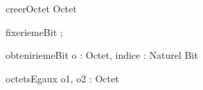 
\begin{algorithme}

\signaturefonction
{creerOctet}
{}
{Octet}


\signatureProcedure
{fixeriemeBit}
{ ; }

\signatureFonction
{obteniriemeBit}
{o : Octet, indice : Naturel}
{Bit}


\signaturefonction
{octetsEgaux}
{o1, o2 : Octet}
{\booleen}

\end{algorithme}